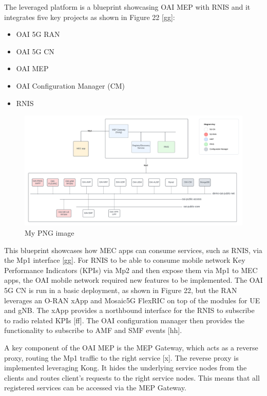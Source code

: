 \documentclass[12pt,a4paper,twoside]{report}
\begin{document}
The leveraged platform is a blueprint showcasing OAI MEP with RNIS and it integrates five key projects as shown in Figure 22 [gg]:
\begin{itemize}
	\item OAI 5G RAN
	\item OAI 5G CN
	\item OAI MEP
	\item OAI Configuration Manager (CM)
	\item RNIS
\end{itemize}
\begin{figure}[ht]
	\centering
	\includegraphics[width=13cm]{./images/OAI-MEP-parts.png} 
	\caption{My PNG image}
\end{figure}
This blueprint showcases how MEC apps can consume services, such as RNIS, via the Mp1 interface [gg]. For RNIS to be able to consume mobile network Key Performance Indicators (KPIs) via Mp2 and then expose them via Mp1 to MEC apps, the OAI mobile network required new features to be implemented. The OAI 5G CN is run in a basic deployment, as shown in Figure 22, but the RAN leverages an O-RAN xApp and Mosaic5G FlexRIC on top of the modules for UE and gNB. The xApp provides a northbound interface for the RNIS to subscribe to radio related KPIs [ff]. The OAI configuration manager then provides the functionality to subscribe to AMF and SMF events [hh]. 

A key component of the OAI MEP is the MEP Gateway, which acts as a reverse proxy, routing the Mp1 traffic to the right service [x]. The reverse proxy is implemented leveraging Kong. It hides the underlying service nodes from the clients and routes client’s requests to the right service nodes. This means that all registered services can be accessed via the MEP Gateway. 
\end{document}
